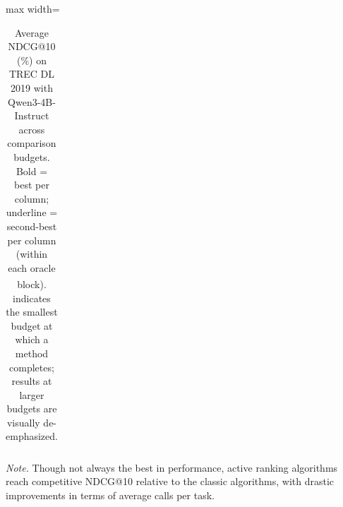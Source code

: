 \documentclass[11pt]{article}
\begin{document}
\begin{table}[!hbp]
\begin{adjustbox}{max width=\textwidth}
\begin{tabular}{c l rrrrrrrrr}
\bottomrule
\end{tabular}%
\end{adjustbox}
\caption{Average NDCG@10 (\%) on TREC DL 2019 with Qwen3-4B-Instruct across comparison budgets. Bold = best per column; underline = second-best per column (within each oracle block). \textsuperscript{\textdagger} indicates the smallest budget at which a method completes; results at larger budgets are visually de-emphasized.}
\label{tab:budget_ndcg10_oracles_qwen3_4b_dl2019}
\par\vspace{2pt}\footnotesize\noindent\textit{Note.} Though not always the best in performance, active ranking algorithms reach competitive NDCG@10 relative to the classic algorithms, with drastic improvements in terms of average calls per task.


\end{table}
\end{document}
